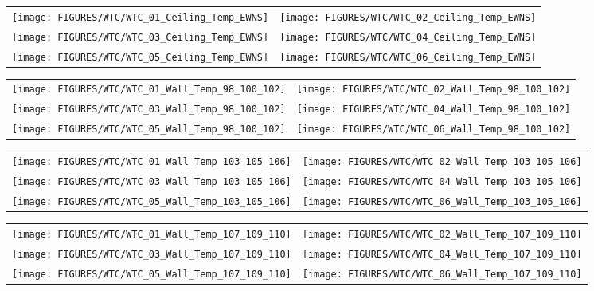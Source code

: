 \begin{figure}[p]
\begin{tabular*}{\textwidth}{l@{\extracolsep{\fill}}r}
\texttt{[image: FIGURES/WTC/WTC\_01\_Ceiling\_Temp\_EWNS]} &
\texttt{[image: FIGURES/WTC/WTC\_02\_Ceiling\_Temp\_EWNS]} \\
\texttt{[image: FIGURES/WTC/WTC\_03\_Ceiling\_Temp\_EWNS]} &
\texttt{[image: FIGURES/WTC/WTC\_04\_Ceiling\_Temp\_EWNS]} \\
\texttt{[image: FIGURES/WTC/WTC\_05\_Ceiling\_Temp\_EWNS]} &
\texttt{[image: FIGURES/WTC/WTC\_06\_Ceiling\_Temp\_EWNS]}
\end{tabular*}
\label{NIST_WTC_Ceiling_EWNS}
\end{figure}

\begin{figure}[p]
\begin{tabular*}{\textwidth}{l@{\extracolsep{\fill}}r}
\texttt{[image: FIGURES/WTC/WTC\_01\_Wall\_Temp\_98\_100\_102]} &
\texttt{[image: FIGURES/WTC/WTC\_02\_Wall\_Temp\_98\_100\_102]} \\
\texttt{[image: FIGURES/WTC/WTC\_03\_Wall\_Temp\_98\_100\_102]} &
\texttt{[image: FIGURES/WTC/WTC\_04\_Wall\_Temp\_98\_100\_102]} \\
\texttt{[image: FIGURES/WTC/WTC\_05\_Wall\_Temp\_98\_100\_102]} &
\texttt{[image: FIGURES/WTC/WTC\_06\_Wall\_Temp\_98\_100\_102]}
\end{tabular*}
\label{NIST_WTC_Wall_98_100_102}
\end{figure}

\begin{figure}[p]
\begin{tabular*}{\textwidth}{l@{\extracolsep{\fill}}r}
\texttt{[image: FIGURES/WTC/WTC\_01\_Wall\_Temp\_103\_105\_106]} &
\texttt{[image: FIGURES/WTC/WTC\_02\_Wall\_Temp\_103\_105\_106]} \\
\texttt{[image: FIGURES/WTC/WTC\_03\_Wall\_Temp\_103\_105\_106]} &
\texttt{[image: FIGURES/WTC/WTC\_04\_Wall\_Temp\_103\_105\_106]} \\
\texttt{[image: FIGURES/WTC/WTC\_05\_Wall\_Temp\_103\_105\_106]} &
\texttt{[image: FIGURES/WTC/WTC\_06\_Wall\_Temp\_103\_105\_106]}
\end{tabular*}
\label{NIST_WTC_Wall_103_105_106}
\end{figure}

\begin{figure}[p]
\begin{tabular*}{\textwidth}{l@{\extracolsep{\fill}}r}
\texttt{[image: FIGURES/WTC/WTC\_01\_Wall\_Temp\_107\_109\_110]} &
\texttt{[image: FIGURES/WTC/WTC\_02\_Wall\_Temp\_107\_109\_110]} \\
\texttt{[image: FIGURES/WTC/WTC\_03\_Wall\_Temp\_107\_109\_110]} &
\texttt{[image: FIGURES/WTC/WTC\_04\_Wall\_Temp\_107\_109\_110]} \\
\texttt{[image: FIGURES/WTC/WTC\_05\_Wall\_Temp\_107\_109\_110]} &
\texttt{[image: FIGURES/WTC/WTC\_06\_Wall\_Temp\_107\_109\_110]}
\end{tabular*}
\label{NIST_WTC_Wall_107_109_110}
\end{figure}

